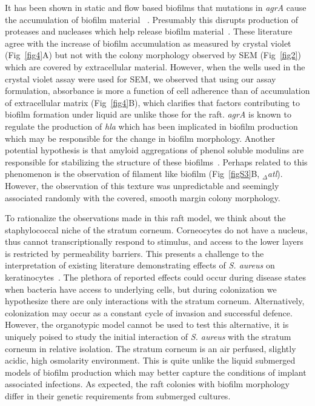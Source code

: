 \documentclass[10pt,letterpaper]{article}
\begin{document}
It has been shown in static and flow based biofilms that mutations in \textit{agrA} cause the accumulation of biofilm material ~\cite{periasamy_how_2012}.
Presumably this disrupts production of proteases and nucleases which help release biofilm material~\cite{boles_agr-mediated_2008, kiedrowski_nuclease_2011}.
These literature agree with the increase of biofilm accumulation as measured by crystal violet (Fig~\ref{fig4}A) but not with the colony morphology observed by SEM (Fig~\ref{fig2}) which are covered by extracellular material.
However, when the wells used in the crystal violet assay were used for SEM, we observed that using our assay formulation, absorbance is more a function of cell adherence than of accumulation of extracellular matrix (Fig~\ref{fig4}B), which clarifies that factors contributing to biofilm formation under liquid are unlike those for the raft.
\textit{agrA} is known to regulate the production of \textit{hla} which has been implicated in biofilm production~\cite{caiazza_alpha-toxin_2003} which may be responsible for the change in biofilm morphology.
Another potential hypothesis is that amyloid aggregations of phenol soluble modulins are responsible for stabilizing the structure of these biofilms~\cite{schwartz_functional_2012}.
Perhaps related to this phenomenon is the observation of filament like biofilm (Fig~\ref{figS3}B, $_\Delta$\textit{atl}).
However, the observation of this texture was unpredictable and seemingly associated randomly with the covered, smooth margin colony morphology.

To rationalize the observations made in this raft model, we think about the staphylococcal niche of the stratum corneum.
Corneocytes do not have a nucleus, thus cannot transcriptionally respond to stimulus, and access to the lower layers is restricted by permeability barriers.
This presents a challenge to the interpretation of existing literature demonstrating effects of \textit{S. aureus} on keratinocytes~\cite{mempel_invasion_2002, menzies_signal_2006, secor_staphylococcus_2011, soong_methicillin-resistant_2015, haugwitz_pore-forming_2006}.
The plethora of reported effects could occur during disease states when bacteria have access to underlying cells, but during colonization we hypothesize there are only interactions with the stratum corneum.
Alternatively, colonization may occur as a constant cycle of invasion and successful defence.
However, the organotypic model cannot be used to test this alternative, it is uniquely poised to study the initial interaction of \textit{S. aureus} with the stratum corneum in relative isolation.
The stratum corneum is an air perfused, slightly acidic, high osmolarity environment.
This is quite unlike the liquid submerged models of biofilm production which may better capture the conditions of implant associated infections.
As expected, the raft colonies with biofilm morphology differ in their genetic requirements from submerged cultures.
\end{document}
